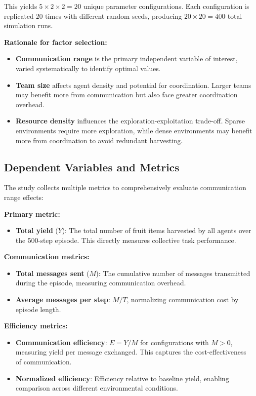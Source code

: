 This yields $5 \times 2 \times 2 = 20$ unique parameter configurations. Each configuration is replicated 20 times with different random seeds, producing $20 \times 20 = 400$ total simulation runs.

\textbf{Rationale for factor selection:}

\begin{itemize}
    \item \textbf{Communication range} is the primary independent variable of interest, varied systematically to identify optimal values.

    \item \textbf{Team size} affects agent density and potential for coordination. Larger teams may benefit more from communication but also face greater coordination overhead.

    \item \textbf{Resource density} influences the exploration-exploitation trade-off. Sparse environments require more exploration, while dense environments may benefit more from coordination to avoid redundant harvesting.
\end{itemize}

\subsection{Dependent Variables and Metrics}

The study collects multiple metrics to comprehensively evaluate communication range effects:

\textbf{Primary metric:}
\begin{itemize}
    \item \textbf{Total yield} ($Y$): The total number of fruit items harvested by all agents over the 500-step episode. This directly measures collective task performance.
\end{itemize}

\textbf{Communication metrics:}
\begin{itemize}
    \item \textbf{Total messages sent} ($M$): The cumulative number of messages transmitted during the episode, measuring communication overhead.

    \item \textbf{Average messages per step}: $M / T$, normalizing communication cost by episode length.
\end{itemize}

\textbf{Efficiency metrics:}
\begin{itemize}
    \item \textbf{Communication efficiency}: $E = Y / M$ for configurations with $M > 0$, measuring yield per message exchanged. This captures the cost-effectiveness of communication.

    \item \textbf{Normalized efficiency}: Efficiency relative to baseline yield, enabling comparison across different environmental conditions.
\end{itemize}

